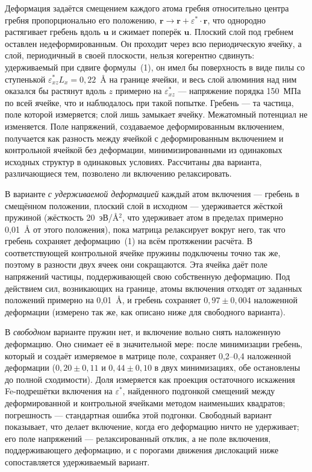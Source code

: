 Деформация задаётся смещением каждого атома гребня относительно центра
гребня пропорционально его положению,
$\mathbf{r} \rightarrow \mathbf{r} + \varepsilon^{*}\!\cdot\!\mathbf{r}$, что
однородно растягивает гребень вдоль $\mathbf{u}$ и сжимает поперёк
$\mathbf{u}$. Плоский слой под гребнем оставлен недеформированным. Он
проходит через всю периодическую ячейку, а слой, периодичный в своей
плоскости, нельзя когерентно сдвинуть: удерживаемый при сдвиге формулы~(1),
он имел бы поверхность в виде пилы со ступенькой
$\varepsilon^{*}_{xz}L_x = 0{,}22$~\AA{} на границе ячейки, и весь слой
алюминия над ним оказался бы растянут вдоль $z$ примерно на
$\varepsilon^{*}_{xz}$ --- напряжение порядка 150~МПа по всей ячейке, что и
наблюдалось при такой попытке. Гребень --- та частица, поле которой
измеряется; слой лишь замыкает ячейку. Межатомный потенциал не изменяется. Поле напряжений,
создаваемое деформированным включением, получается как разность между ячейкой
с деформированным включением и контрольной ячейкой без деформации,
минимизированными из одинаковых исходных структур в одинаковых условиях.
Рассчитаны два варианта, различающиеся тем, позволено ли включению
релаксировать.

В варианте \emph{с удерживаемой деформацией} каждый атом включения ---
гребень в смещённом положении, плоский слой в исходном --- удерживается
жёсткой пружиной (жёсткость 20~эВ/\AA$^{2}$, что удерживает атом в пределах
примерно 0{,}01~\AA{} от этого положения), пока матрица релаксирует вокруг
него, так что гребень сохраняет деформацию~(1) на всём протяжении расчёта. В
соответствующей контрольной ячейке пружины подключены точно так же, поэтому
в разности двух ячеек они сокращаются. Эта ячейка даёт поле напряжений
частицы, поддерживающей свою собственную деформацию. Под действием сил, возникающих на границе, атомы включения отходят от
заданных положений примерно на 0{,}01~\AA{}, и гребень сохраняет
$0{,}97\pm0{,}004$ наложенной деформации (измерено так же, как описано ниже для
свободного варианта).

В \emph{свободном} варианте пружин нет, и включение вольно снять наложенную
деформацию. Оно снимает её в значительной мере: после минимизации гребень,
который и создаёт измеряемое в матрице поле, сохраняет 0{,}2--0{,}4
наложенной деформации ($0{,}20 \pm 0{,}11$ и $0{,}44 \pm 0{,}10$ в двух
минимизациях, обе остановлены до полной сходимости). Доля измеряется как проекция остаточного искажения
Fe-подрешётки включения на $\varepsilon^{*}$, найденного подгонкой смещений
между деформированной и контрольной ячейками методом наименьших квадратов;
погрешность --- стандартная ошибка этой подгонки. Свободный вариант
показывает, что делает включение, когда его деформацию ничто не удерживает;
его поле напряжений --- релаксированный отклик, а не поле включения,
поддерживающего деформацию, и с порогами движения дислокаций ниже
сопоставляется удерживаемый вариант.

